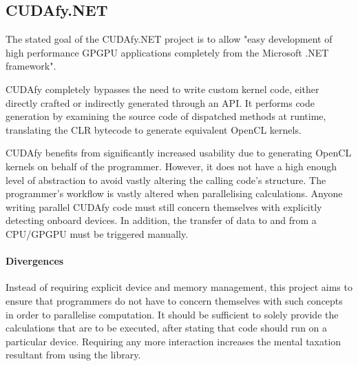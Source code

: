 \subsection{CUDAfy.NET}
The stated goal of the CUDAfy.NET\cite{cudafy} project is to allow "easy development of high performance \ac{GPGPU} applications completely from the Microsoft .NET framework".

CUDAfy completely bypasses the need to write custom kernel code, either directly crafted or indirectly generated through an API. It performs code generation by examining the source code of dispatched methods at runtime, translating the \ac{CLR} bytecode to generate equivalent \ac{OpenCL} kernels.

CUDAfy benefits from significantly increased usability due to generating \ac{OpenCL} kernels on behalf of the programmer. However, it does not have a high enough level of abstraction to avoid vastly altering the calling code's structure. The programmer's workflow is vastly altered when parallelising calculations. Anyone writing parallel CUDAfy code must still concern themselves with explicitly detecting onboard devices. In addition, the transfer of data to and from a \ac{CPU}/\ac{GPGPU} must be triggered manually.

\paragraph{Divergences}
Instead of requiring explicit device and memory management, this project aims to ensure that programmers do not have to concern themselves with such concepts in order to parallelise computation. It should be sufficient to solely provide the calculations that are to be executed, after stating that code should run on a particular device. Requiring any more interaction increases the mental taxation resultant from using the library.
